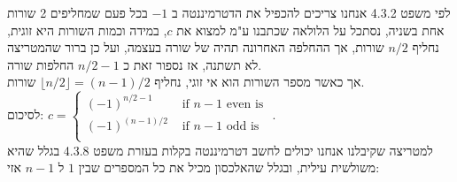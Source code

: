 \documentclass{article}
\begin{document}
	לפי משפט 4.3.2 אנחנו צריכים להכפיל את הדטרמיננטה ב $-1$ בכל פעם שמחליפים 2 שורות אחת בשניה,
	נסתכל על הלולאה שכתבנו ע"מ למצוא את $c$,
	במידה וכמות השורות היא זוגית, נחליף $n/2$ שורות, אך ההחלפה האחרונה תהיה של שורה בעצמה, ועל כן ברור שהמטריצה לא תשתנה, אז נספור זאת כ $n/2-1$ החלפות שורה. \\
	אך כאשר מספר השורות הוא אי זוגי, נחליף $\lfloor n / 2 \rfloor = (n-1)/2$ שורות.  \\
	לסיכום: $
	c =
	\begin{cases}
		(-1)^{n/2 - 1} & \text{ if } n-1 \text{ even is } \\
		(-1)^{(n-1)/2} & \text{ if } n-1 \text{ odd is } \\
	\end{cases}
	$. \\
	למטריצה שקיבלנו אנחנו יכולים לחשב דטרמיננטה בקלות בעזרת משפט 4.3.8 בגלל שהיא משולשית עילית, ובגלל שהאלכסון מכיל את כל המספרים שבין $1$ ל $n-1$ אזי: \\
\end{document}
